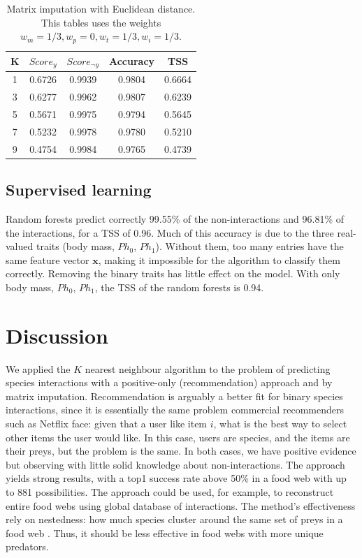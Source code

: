 \documentclass[letterpaper]{article}
\begin{document}
\begin{table}
  \centering
  \begin{tabular}{|c|cccc|}
  \hline
  K                 & $Score_y$ & $Score_{\neg y}$ & Accuracy & TSS \\
  \hline
  \hline
  1                 & 0.6726    & 0.9939            & 0.9804   & 0.6664 \\
  3                 & 0.6277    & 0.9962            & 0.9807   & 0.6239 \\
  5                 & 0.5671    & 0.9975            & 0.9794   & 0.5645 \\
  7                 & 0.5232    & 0.9978            & 0.9780   & 0.5210 \\
  9                 & 0.4754    & 0.9984            & 0.9765   & 0.4739 \\
  \hline
  \end{tabular}

  \caption{Matrix imputation with Euclidean distance. This tables uses the
  weights $w_m = 1/3, w_p = 0, w_t = 1/3, w_i = 1/3$.}

  \label{table:knn_results}
\end{table}

\subsection{Supervised learning}

Random forests predict correctly 99.55\% of the non-interactions and
96.81\% of the interactions, for a TSS of 0.96. Much of this accuracy is due to
the three real-valued traits (body mass, $Ph_0$, $Ph_1$). Without them, too
many entries have the same feature vector $\mathbf{x}$, making it impossible
for the algorithm to classify them correctly. Removing the binary traits has
little effect on the model. With only body mass, $Ph_0$, $Ph_1$, the TSS of
the random forests is 0.94.

\section{Discussion}

We applied the $K$ nearest neighbour algorithm to the problem of predicting
species interactions with a positive-only (recommendation) approach and by
matrix imputation. Recommendation is arguably a better fit for binary species
interactions, since it is essentially the same problem commercial recommenders
such as Netflix face: given that a user like item $i$, what is the best way to
select other items the user would like. In this case, users are species, and
the items are their preys, but the problem is the same. In both cases, we have
positive evidence but observing with little solid knowledge about
non-interactions. %
The approach yields strong results, with a top1 success rate
above 50\% in a food web with up to 881 possibilities. The approach could be
used, for example, to reconstruct entire food webs using global database of
interactions. The method's effectiveness rely on nestedness: how much species
cluster around the same set of preys in a food web \cite{gui06}. Thus, it
should be less effective in food webs with more unique predators.
\end{document}
